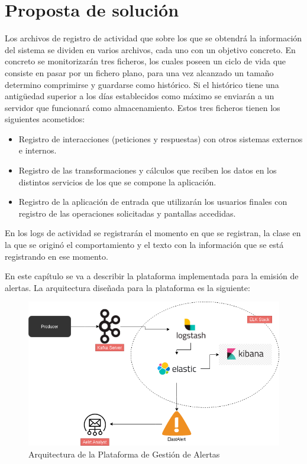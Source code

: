 \chapter{Proposta de solución}


Los archivos de registro de actividad que sobre los que se obtendrá la información del sistema se dividen en varios archivos, cada uno con un objetivo concreto. En concreto se monitorizarán tres ficheros, los cuales poseen un ciclo de vida que consiste en pasar por un fichero plano, para una vez alcanzado un tamaño determino comprimirse y guardarse como histórico. Si el histórico tiene una antigüedad superior a los días establecidos como máximo se enviarán a un servidor que funcionará como almacenamiento. Estos tres ficheros tienen los siguientes acometidos:

\begin{itemize}
\item Registro de interacciones (peticiones y respuestas) con otros sistemas externos e internos.
\item Registro de las transformaciones y cálculos que reciben los datos en los distintos servicios de los que se compone la aplicación.
\item Registro de la aplicación de entrada que utilizarán los usuarios finales con registro de las operaciones solicitadas y pantallas accedidas.
\end{itemize}

En los logs de actividad se registrarán el momento en que se registran, la clase en la que se originó el comportamiento y el texto con la información que se está registrando en ese momento.


En este capítulo se va a describir la plataforma implementada para la emisión de alertas. La arquitectura diseñada para la plataforma es la siguiente:

\begin{figure}[H]
\centerline{\includegraphics[width=15cm]{figuras/arquitectura.png}}
\caption{Arquitectura de la Plataforma de Gestión de Alertas}
\label{enlace1}
\end{figure}

